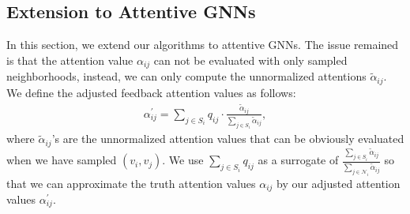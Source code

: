 \documentclass{article}
\begin{document}
\subsection{Extension to Attentive GNNs}
\begin{comment}
Another advantage of our formulation is that, our samplers
can be naturally applied to attentive graph neural networks
where the attention values $\alpha_{ij}$'s vary constantly
during the training procedure. Existing approaches cannot
evaluate Eq.~\eqref{eq:optimal_q} since they need to calculate
those $\alpha_{ij}$'s before calculating the sampling distribution.
However, in our case, as long as our reward or regret 
can factorize with respect to hidden embedding $h(v_j)$
or these learned weights $\alpha_{ij}$, our approaches
can still apply to such architectures.
\end{comment}

In this section, we extend our algorithms to
attentive GNNs.
The issue remained is that the attention value $\alpha_{ij}$ 
can not be evaluated with only sampled neighborhoods,
instead, we can only compute the unnormalized attentions $\tilde{\alpha}_{ij}$.
We define the adjusted feedback attention values as follows:
\begin{align}
\alpha_{ij}^{\prime} = \sum_{j\in S_i}q_{ij}\cdot\frac{\tilde{\alpha}_{ij}}{\sum_{j\in S_i}\tilde{\alpha}_{ij}},
\end{align}
where $\tilde{\alpha}_{ij}$'s are the unnormalized attention values that can be obviously
evaluated when we have sampled $(v_i, v_j)$.
We use $\sum_{j\in S_i} q_{ij}$ as a surrogate of 
$\frac{\sum_{j\in S_i}\tilde{\alpha}_{ij}}{\sum_{j\in \mathcal{N}_i}\tilde{\alpha}_{ij}}$
so that we can approximate the truth attention values $\alpha_{ij}$ by our
adjusted attention values $\alpha_{ij}^{\prime}$.
\end{document}
